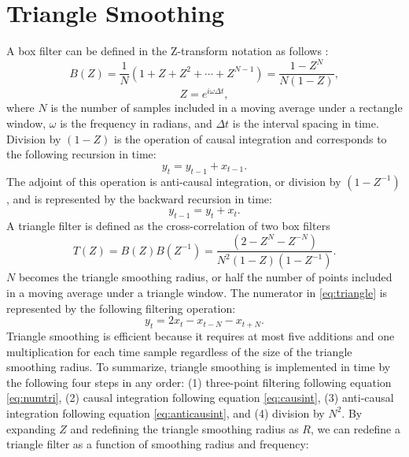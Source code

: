 \section{Triangle Smoothing}
A box filter can be defined in the Z-transform notation as follows \cite[]{claerbout1992}:
\begin{equation}
B(Z) = \frac{1}{N} (1 + Z + Z^2 +\cdots+Z^{N-1}) = \frac{1-Z^N}{N(1-Z)},
\end{equation}
\begin{equation}
Z = e^{i\omega\Delta t},
\end{equation}
where $N$ is the number of samples included in a moving average under a rectangle window, $\omega$ is the frequency in radians, and $\Delta t$ is the interval spacing in time. Division by $(1-Z)$ is the operation of causal integration and corresponds to the following recursion in time:
\begin{equation}
y_t = y_{t-1}+x_{t-1}.
\label{eq:causint}
\end{equation}
The adjoint of this operation is anti-causal integration, or division by $(1-Z^{-1})$, and is represented by the backward recursion in time:
\begin{equation}
y_{t-1} = y_{t}+x_{t}.
\label{eq:anticausint}
\end{equation}
A triangle filter is defined as the cross-correlation of two box filters \cite[]{claerbout1992}
\begin{equation}
T(Z) = B(Z)B(Z^{-1}) = \frac{(2-Z^N-Z^{-N})}{N^2(1-Z)(1-Z^{-1})}.
\label{eq:triangle}
\end{equation}
$N$ becomes the triangle smoothing radius, or half the number of points included in a moving average under a triangle window. The numerator in \ref{eq:triangle} is represented by the following filtering operation:
\begin{equation}
y_{t} = 2x_t-x_{t-N}-x_{t+N}.
\label{eq:numtri}
\end{equation}
Triangle smoothing is efficient because it requires at most five additions and one multiplication for each time sample regardless of the size of the triangle smoothing radius. 
To summarize, triangle smoothing is implemented in time by the following four steps in any order: (1) three-point filtering following equation \ref{eq:numtri}, (2) causal integration following equation \ref{eq:causint}, (3) anti-causal integration following equation \ref{eq:anticausint}, and (4) division by $N^2$. 
By expanding $Z$ and redefining the triangle smoothing radius as $R$, we can redefine a triangle filter as a function of smoothing radius and frequency:
